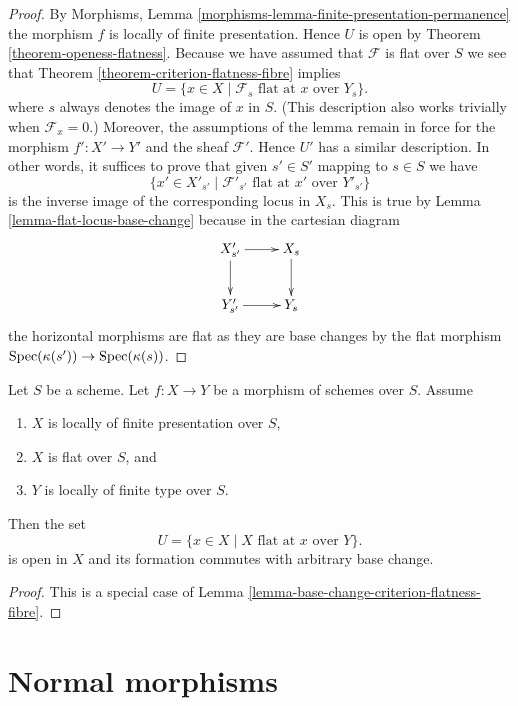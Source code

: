 \begin{proof}
By
Morphisms, Lemma \ref{morphisms-lemma-finite-presentation-permanence}
the morphism $f$ is locally of finite presentation.
Hence $U$ is open by
Theorem \ref{theorem-openess-flatness}.
Because we have assumed that $\mathcal{F}$ is flat over $S$ we see that
Theorem \ref{theorem-criterion-flatness-fibre}
implies
$$
U = \{x \in X \mid \mathcal{F}_s \text{ flat at }x \text{ over }Y_s\}.
$$
where $s$ always denotes the image of $x$ in $S$. (This description also
works trivially when $\mathcal{F}_x = 0$.) Moreover, the assumptions
of the lemma remain in force for the morphism $f' : X' \to Y'$
and the sheaf $\mathcal{F}'$. Hence $U'$ has a similar description.
In other words, it suffices to prove that given
$s' \in S'$ mapping to $s \in S$ we have
$$
\{x' \in X'_{s'} \mid
\mathcal{F}'_{s'} \text{ flat at }x' \text{ over }Y'_{s'}\}
$$
is the inverse image of the corresponding locus in $X_s$.
This is true by
Lemma \ref{lemma-flat-locus-base-change}
because in the cartesian diagram
$$
\xymatrix{
X'_{s'} \ar[d] \ar[r] & X_s \ar[d] \\
Y'_{s'} \ar[r] & Y_s
}
$$
the horizontal morphisms are flat as they are base changes by the flat
morphism $\mathop{\rm Spec}(\kappa(s')) \to \mathop{\rm Spec}(\kappa(s))$.
\end{proof}

\begin{lemma}
\label{lemma-base-change-flatness-fibres}
Let $S$ be a scheme. Let $f : X \to Y$ be a morphism of schemes over $S$.
Assume
\begin{enumerate}
\item $X$ is locally of finite presentation over $S$,
\item $X$ is flat over $S$, and
\item $Y$ is locally of finite type over $S$.
\end{enumerate}
Then the set
$$
U = \{x \in X \mid X\text{ flat at }x \text{ over }Y\}.
$$
is open in $X$ and its formation commutes with arbitrary base change.
\end{lemma}

\begin{proof}
This is a special case of
Lemma \ref{lemma-base-change-criterion-flatness-fibre}.
\end{proof}






\section{Normal morphisms}
\label{section-normal}

